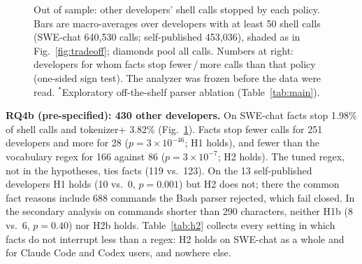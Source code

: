 \documentclass[conference]{IEEEtran}
\begin{document}
\begin{figure}[t]
\caption{Out of sample: other developers' shell calls stopped by each policy. Bars are macro-averages over developers with at least 50 shell calls (SWE-chat 640,530 calls; self-published 453,036), shaded as in Fig.~\ref{fig:tradeoff}; diamonds pool all calls. Numbers at right: developers for whom facts stop fewer\,/\,more calls than that policy (one-sided sign test). The analyzer was frozen before the data were read. $^\ast$Exploratory off-the-shelf parser ablation (Table~\ref{tab:main}).}
\label{fig:oos}
\end{figure}

\textbf{RQ4b (pre-specified): 430 other developers.} On SWE-chat facts stop 1.98\% of shell calls and tokenizer+ 3.82\% (Fig.~\ref{fig:oos}). Facts stop fewer calls for 251 developers and more for 28 ($p=3\times10^{-46}$; H1 holds), and fewer than the vocabulary regex for 166 against 86 ($p=3\times10^{-7}$; H2 holds). The tuned regex, not in the hypotheses, ties facts (119 vs.\ 123). On the 13 self-published developers H1 holds (10 vs.\ 0, $p=0.001$) but H2 does not; there the common fact reasons include 688 commands the Bash parser rejected, which fail closed. In the secondary analysis on commands shorter than 290 characters, neither H1b (8 vs.\ 6, $p=0.40$) nor H2b holds. Table~\ref{tab:h2} collects every setting in which facts do not interrupt less than a regex: H2 holds on SWE-chat as a whole and for Claude Code and Codex users, and nowhere else.
\end{document}
